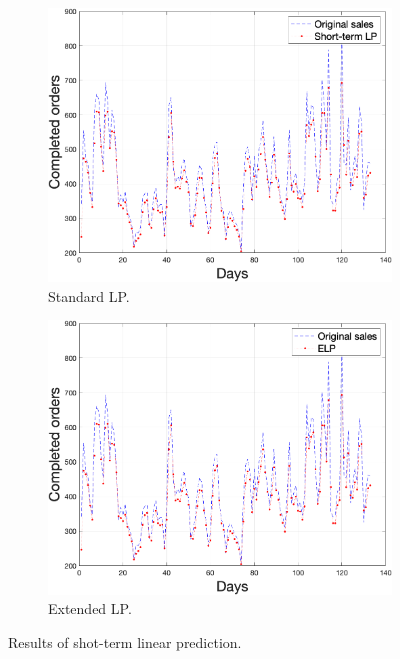     \begin{figure}
        \centering
        \begin{subfigure}[b]{0.4\textwidth}
            \includegraphics[width=\textwidth]{figures/expLP.png}
            \caption{Standard LP.}
            \label{fig:slpres}
        \end{subfigure}
        \hspace{0.1\textwidth}
        \begin{subfigure}[b]{0.4\textwidth}
            \includegraphics[width=\textwidth]{figures/expELP.png}
            \caption{Extended LP.}
            \label{fig:slpmse}
        \end{subfigure}
        \caption{Results of shot-term linear prediction.}
        \label{fig:shortresult}
    \end{figure}
    
